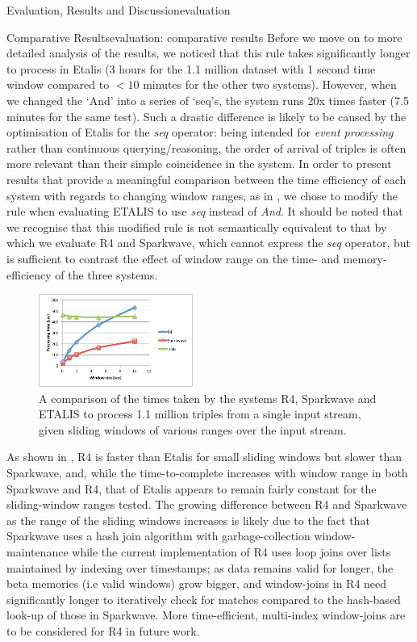 \begin{nestedsection}{Evaluation, Results and Discussion}{evaluation}
\begin{nestedsection}{Comparative Results}{evaluation: comparative results}
		Before we move on to more detailed analysis of the results, we noticed that this rule takes significantly longer to process in Etalis (3 hours for the 1.1 million dataset with 1 second time window compared to ${<10}$ minutes for the other two systems).
		However, when we changed the `And' into a series of `seq's, the system runs 20x times faster (7.5 minutes for the same test).
		Such a drastic difference is likely to be caused by the optimisation of Etalis for the \emph{seq} operator: being intended for \emph{event processing} rather than continuous querying/reasoning, the order of arrival of triples is often more relevant than their simple coincidence in the system.
		In order to present results that provide a meaningful comparison between the time efficiency of each system with regards to changing window ranges, as in , we chose to modify the rule when evaluating ETALIS to use \emph{seq} instead of \emph{And}.
		It should be noted that we recognise that this modified rule is not semantically equivalent to that by which we evaluate R4 and Sparkwave, which cannot express the \emph{seq} operator, but is sufficient to contrast the effect of window range on the time- and memory-efficiency of the three systems.
		\begin{figure}
			\centering
			\includegraphics[width=0.45\textwidth]{all-systems-varying-windows}
			\caption{A comparison of the times taken by the systems R4, Sparkwave and ETALIS to process 1.1 million triples from a single input stream, given sliding windows of various ranges over the input stream.}
		\end{figure}

		As shown in , R4 is faster than Etalis for small sliding windows but slower than Sparkwave, and, while the time-to-complete increases with window range in both Sparkwave and R4, that of Etalis appears to remain fairly constant for the sliding-window ranges tested.
		The growing difference between R4 and Sparkwave as the range of the sliding windows increases is likely due to the fact that Sparkwave uses a hash join algorithm with garbage-collection window-maintenance while the current implementation of R4 uses loop joins over lists maintained by indexing over timestamps;
		as data remains valid for longer, the beta memories (i.e valid windows) grow bigger, and window-joins in R4 need significantly longer to iteratively check for matches compared to the hash-based look-up of those in Sparkwave.
		More time-efficient, multi-index window-joins are to be considered for R4 in future work.


\end{nestedsection}
\end{nestedsection}
